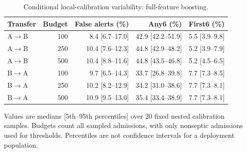 \begin{table}[htbp]
\centering
\small
\setlength{\tabcolsep}{4pt}
\renewcommand{\arraystretch}{1.18}
\caption{Conditional local-calibration variability: full-feature boosting.}\label{tab:sbud}
\begin{tabular}{lrrrr}
\toprule
Transfer & Budget & False alerts (\%) & Any6 (\%) & First6 (\%) \\
\midrule
A$\to$B & 100 & 8.4 [6.7--17.0] & 42.9 [42.2--51.9] & 5.5 [3.9--9.8] \\
A$\to$B & 250 & 10.4 [7.6--12.3] & 44.8 [42.9--48.2] & 5.2 [3.9--7.9] \\
A$\to$B & 500 & 10.4 [8.8--11.6] & 44.8 [43.5--46.8] & 5.2 [4.5--6.5] \\
B$\to$A & 100 & 9.7 [6.5--14.3] & 33.7 [26.8--39.8] & 7.7 [7.3--8.5] \\
B$\to$A & 250 & 10.2 [8.2--12.9] & 34.2 [31.0--38.6] & 7.7 [7.3--8.1] \\
B$\to$A & 500 & 10.9 [9.5--13.0] & 35.4 [33.4--38.9] & 7.7 [7.3--8.1] \\
\bottomrule
\end{tabular}
\par\vspace{3pt}\begin{minipage}{\linewidth}\footnotesize Values are medians [5th--95th percentiles] over 20 fixed nested calibration samples. Budgets count all sampled admissions, with only nonseptic admissions used for thresholds. Percentiles are not confidence intervals for a deployment population.\end{minipage}
\end{table}
